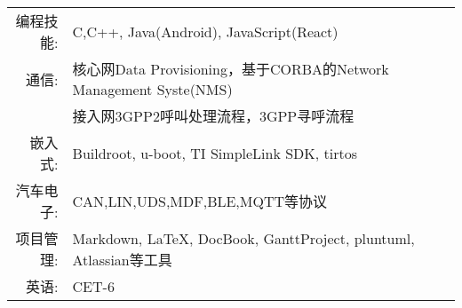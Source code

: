 %
%


 
\renewcommand{\arraystretch}{1.1}

	\begin{tabular}{>{}r>{}p{13cm}} 
		\textsc{编程技能:}      & C,C++, Java(Android), JavaScript(React)\\  
		\textsc{通信:} 		   & 核心网Data Provisioning，基于CORBA的Network Management Syste(NMS)\\
							   & 接入网3GPP2呼叫处理流程，3GPP寻呼流程 \\
		\textsc{嵌入式:}	   & Buildroot, u-boot, TI SimpleLink SDK, tirtos  \\
		\textsc{汽车电子:}	   & CAN,LIN,UDS,MDF,BLE,MQTT等协议 \\
		\textsc{项目管理:}	   & Markdown, LaTeX, DocBook, GanttProject, pluntuml, Atlassian等工具 \\
		\textsc{英语:}	    &  CET-6 \\
	\end{tabular}
	

